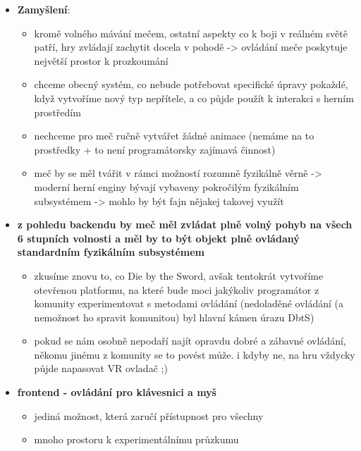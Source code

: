 \begin{itemize}
    \item \textbf{Zamyšlení}:
        \begin{itemize}
            \item kromě volného mávání mečem, ostatní aspekty co k boji v reálném světě patří, hry zvládají zachytit docela v pohodě -> ovládání meče poskytuje největší prostor k prozkoumání
            \item chceme obecný systém, co nebude potřebovat specifické úpravy pokaždé, když vytvoříme nový typ nepřítele, a co půjde použít k interakci s herním prostředím
            \item nechceme pro meč ručně vytvářet žádné animace (nemáme na to prostředky + to není programátorsky zajímavá činnost)
            \item meč by se měl tvářit v rámci možností rozumně fyzikálně věrně -> moderní herní enginy bývají vybaveny pokročilým fyzikálním subsystémem -> mohlo by být fajn nějakej takovej využít
        \end{itemize}
    
    \item \textbf{z pohledu backendu by meč měl zvládat plně volný pohyb na všech 6 stupních volnosti a měl by to být objekt plně ovládaný standardním fyzikálním subsystémem}
        \begin{itemize}
            \item zkusíme znovu to, co Die by the Sword, avšak tentokrát vytvoříme otevřenou platformu, na které bude moci jakýkoliv programátor z komunity experimentovat s metodami ovládání (nedoladěné ovládání (a nemožnost ho spravit komunitou) byl hlavní kámen úrazu DbtS)
            \item pokud se nám osobně nepodaří najít opravdu dobré a zábavné ovládání, někomu jinému z komunity se to povést může. i kdyby ne, na hru vždycky půjde napasovat VR ovladač ;)
        \end{itemize}
    \item \textbf{frontend - ovládání pro klávesnici a myš}
        \begin{itemize}
            \item jediná možnost, která zaručí přístupnost pro všechny
            \item mnoho prostoru k experimentálnímu průzkumu
        \end{itemize}
\end{itemize}

